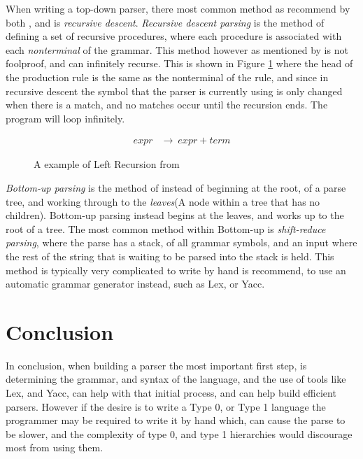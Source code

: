 When writing a top-down parser, there most common method as recommend by both \cite{DragonBook}, and \cite{ParseTech} is \emph{recursive descent}. \emph{Recursive descent parsing} is the method of defining a set of recursive procedures, where each procedure is associated with each \emph{nonterminal} of the grammar. This method however as mentioned by \cite{DragonBook} is not foolproof, and can infinitely recurse. This is shown in Figure \ref{fig:leftR} where the head of the production rule is the same as the nonterminal of the rule, and since in recursive descent the symbol that the parser is currently using is only changed when there is a match, and no matches occur until the recursion ends. The program will loop infinitely.

\begin{figure}[ht!]
    \begin{align*}
        expr &\rightarrow\ expr + term
    \end{align*}
    \caption{A example of Left Recursion from \cite{DragonBook}}
    \label{fig:leftR}
\end{figure}
\newpage
\emph{Bottom-up parsing} is the method of instead of beginning at the root, of a parse tree, and working through to the \emph{leaves}(A node within a tree that has no children). Bottom-up parsing instead begins at the leaves, and works up to the root of a tree. The most common method within Bottom-up is \emph{shift-reduce parsing}, where the parse has a stack, of all grammar symbols, and an input where the rest of the string that is waiting to be parsed into the stack is held. This method is typically very complicated to write by hand is recommend, to use an automatic grammar generator instead, such as Lex, or Yacc.

\newpage
\section{Conclusion}
In conclusion, when building a parser the most important first step, is determining the grammar, and syntax of the language, and the use of tools like Lex, and Yacc, can help with that initial process, and can help build efficient parsers. However if the desire is to write a Type 0, or Type 1 language the programmer may be required to write it by hand which, can cause the parse to be slower, and the complexity of type 0, and type 1 hierarchies would discourage most from using them.
\newpage
